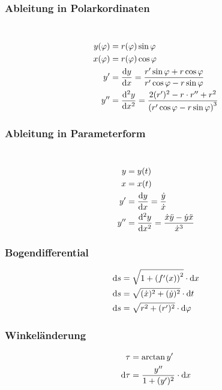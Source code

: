 \begin{multicols}{2}
\subsubsection*{Ableitung in Polarkordinaten}
\\
\begin{align*} 
y(\varphi)&=r(\varphi)\sin\varphi\\
x(\varphi)&=r(\varphi)\cos\varphi\\
y'&=\frac{\mathop{}\!\mathrm{d} y}{\mathop{}\!\mathrm{d} x}=\frac{r'\sin\varphi+r\cos\varphi}{r'\cos\varphi-r\sin\varphi}\\
y''&=\frac{\mathop{}\!\mathrm{d}^2 y}{\mathop{}\!\mathrm{d} x^2}=\frac{2(r')^2-r\cdot r''+r^2}{\left(r'\cos\varphi-r\sin\varphi\right)^3}
\end{align*}
\vfill
\subsubsection*{Ableitung in Parameterform}
\\
\begin{align*} 
y&=y(t)\\
x&=x(t)\\
y'&=\frac{\mathop{}\!\mathrm{d} y}{\mathop{}\!\mathrm{d} x}=\frac{\dot{y}}{\dot{x}}\\
y''&=\frac{\mathop{}\!\mathrm{d}^2 y}{\mathop{}\!\mathrm{d} x^2}=\frac{\dot{x}\ddot{y}-\dot{y}\ddot{x}}{\dot{x}^3}
\end{align*}
\vfill
\end{multicols}

\begin{multicols}{2}
\subsubsection*{Bogendifferential}
\begin{align*} 
\mathop{}\!\mathrm{d} s&=\sqrt{1+\left(f'(x)\right)^2}\cdot \mathop{}\!\mathrm{d} x\\
\mathop{}\!\mathrm{d} s&=\sqrt{(\dot{x})^2+(\dot{y})^2}\cdot \mathop{}\!\mathrm{d} t\\
\mathop{}\!\mathrm{d} s&=\sqrt{r^2+(r')^2}\cdot \mathop{}\!\mathrm{d} \varphi
\end{align*}
\vfill
\subsubsection*{Winkeländerung}
\begin{align*} 
\tau&=\arctan y'\\
\mathop{}\!\mathrm{d} \tau&=\frac{y''}{1+(y')^2}\cdot \mathop{}\!\mathrm{d} x
\end{align*}
\vfill
\end{multicols}

